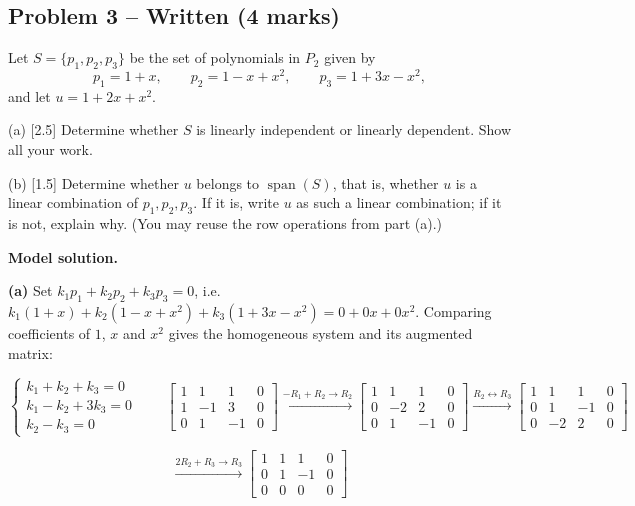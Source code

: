 \documentclass[11pt,a4paper]{article}
\begin{document}
\subsection*{Problem 3 -- Written (4 marks)}
Let $S=\{p_1,p_2,p_3\}$ be the set of polynomials in $P_2$ given by\[p_1=1+x,\qquad p_2=1-x+x^{2},\qquad p_3=1+3x-x^{2},\]and let $u=1+2x+x^{2}$.\par (a) [2.5] Determine whether $S$ is linearly independent or linearly dependent. Show all your work.\par (b) [1.5] Determine whether $u$ belongs to $\operatorname{span}(S)$, that is, whether $u$ is a linear combination of $p_1,p_2,p_3$. If it is, write $u$ as such a linear combination; if it is not, explain why. (You may reuse the row operations from part (a).)\par
\textbf{Model solution.}\par{\color{WorkBlue}\textbf{(a)} Set $k_1p_1+k_2p_2+k_3p_3=0$, i.e. $k_1(1+x)+k_2(1-x+x^{2})+k_3(1+3x-x^{2})=0+0x+0x^{2}$. Comparing coefficients of $1$, $x$ and $x^{2}$ gives the homogeneous system and its augmented matrix:

\[ \begin{cases}k_1+k_2+k_3=0\\ k_1-k_2+3k_3=0\\ k_2-k_3=0\end{cases} \qquad \left[\begin{array}{ccc|c} 1 & 1 & 1 & 0 \\ 1 & -1 & 3 & 0 \\ 0 & 1 & -1 & 0 \end{array}\right] \xrightarrow{-R_1+R_2 \to R_2} \left[\begin{array}{ccc|c} 1 & 1 & 1 & 0 \\ 0 & -2 & 2 & 0 \\ 0 & 1 & -1 & 0 \end{array}\right] \xrightarrow{R_2 \leftrightarrow R_3} \left[\begin{array}{ccc|c} 1 & 1 & 1 & 0 \\ 0 & 1 & -1 & 0 \\ 0 & -2 & 2 & 0 \end{array}\right] \]

\[  \xrightarrow{2R_2+R_3 \to R_3} \left[\begin{array}{ccc|c} 1 & 1 & 1 & 0 \\ 0 & 1 & -1 & 0 \\ 0 & 0 & 0 & 0 \end{array}\right] \]

}
\end{document}
